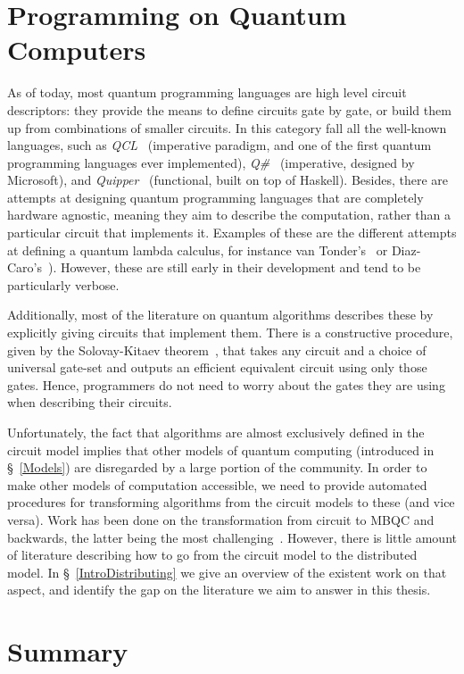 \section{Programming on Quantum Computers}

As of today, most quantum programming languages are high level circuit descriptors: they provide the means to define circuits gate by gate, or build them up from combinations of smaller circuits. In this category fall all the well-known languages, such as \textit{QCL}~\citep{QCL} (imperative paradigm, and one of the first quantum programming languages ever implemented), \textit{Q\#}~\citep{QLang} (imperative, designed by Microsoft), and \textit{Quipper}~\citep{Quipper} (functional, built on top of Haskell). Besides, there are attempts at designing quantum programming languages that are completely hardware agnostic, meaning they aim to describe the computation, rather than a particular circuit that implements it. Examples of these are the different attempts at defining a quantum lambda calculus, for instance van Tonder's~\citep{VanTonder} or Diaz-Caro's~\citep{Diaz-Caro}). However, these are still early in their development and tend to be particularly verbose.

Additionally, most of the literature on quantum algorithms describes these by explicitly giving circuits that implement them. There is a constructive procedure, given by the Solovay-Kitaev theorem~\citep{SolovayKitaev}, that takes any circuit and a choice of universal gate-set and outputs an efficient equivalent circuit using only those gates. Hence, programmers do not need to worry about the gates they are using when describing their circuits.

Unfortunately, the fact that algorithms are almost exclusively defined in the circuit model implies that other models of quantum computing (introduced in \S~\ref{Models}) are disregarded by a large portion of the community. In order to make other models of computation accessible, we need to provide automated procedures for transforming algorithms from the circuit models to these (and vice versa). Work has been done on the transformation from circuit to MBQC and backwards, the latter being the most challenging~\citep{gflow}. However, there is little amount of literature describing how to go from the circuit model to the distributed model. In \S~\ref{IntroDistributing} we give an overview of the existent work on that aspect, and identify the gap on the literature we aim to answer in this thesis.


\section{Summary}

